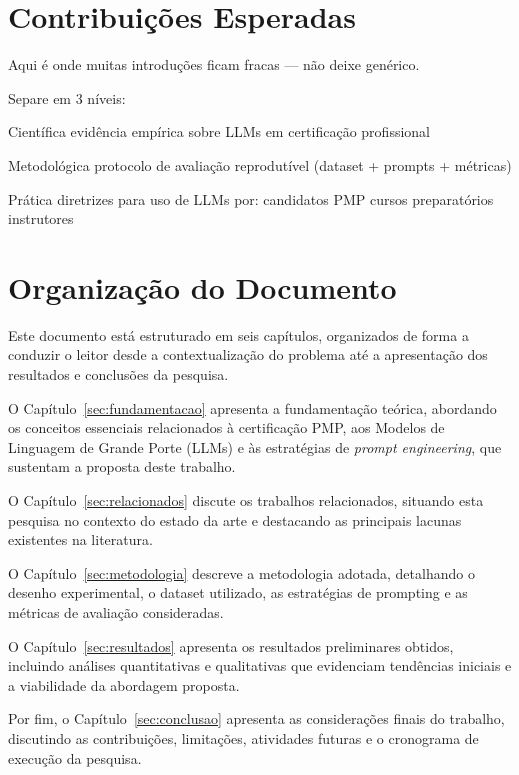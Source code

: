 \section{Contribuições Esperadas}

Aqui é onde muitas introduções ficam fracas — não deixe genérico.

Separe em 3 níveis:

Científica
evidência empírica sobre LLMs em certificação profissional

Metodológica
protocolo de avaliação reprodutível (dataset + prompts + métricas)

Prática
diretrizes para uso de LLMs por:
candidatos PMP
cursos preparatórios
instrutores


\section{Organização do Documento}

Este documento está estruturado em seis capítulos, organizados de forma a conduzir o leitor desde a contextualização do problema até a apresentação dos resultados e conclusões da pesquisa.

O Capítulo~\ref{sec:fundamentacao} apresenta a fundamentação teórica, abordando os conceitos essenciais relacionados à certificação PMP, aos Modelos de Linguagem de Grande Porte (LLMs) e às estratégias de \textit{prompt engineering}, que sustentam a proposta deste trabalho.

O Capítulo~\ref{sec:relacionados} discute os trabalhos relacionados, situando esta pesquisa no contexto do estado da arte e destacando as principais lacunas existentes na literatura.

O Capítulo~\ref{sec:metodologia} descreve a metodologia adotada, detalhando o desenho experimental, o dataset utilizado, as estratégias de prompting e as métricas de avaliação consideradas.

O Capítulo~\ref{sec:resultados} apresenta os resultados preliminares obtidos, incluindo análises quantitativas e qualitativas que evidenciam tendências iniciais e a viabilidade da abordagem proposta.

Por fim, o Capítulo~\ref{sec:conclusao} apresenta as considerações finais do trabalho, discutindo as contribuições, limitações, atividades futuras e o cronograma de execução da pesquisa.
